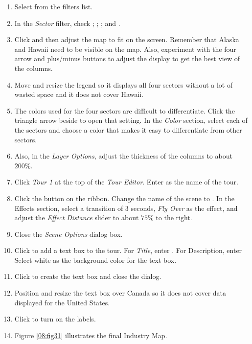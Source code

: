 \begin{enumbox}
\begin{enumerate}
		\item Select  from the filters list.
		\item In the \textit{Sector} filter, check ; ; ; and .
		\item Click  and then adjust the map to fit on the screen. Remember that Alaska and Hawaii need to be visible on the map. Also, experiment with the four arrow and plus/minus buttons to adjust the display to get the best view of the columns.
		\item Move and resize the legend so it displays all four sectors without a lot of wasted space and it does not cover Hawaii.
		\item The colors used for the four sectors are difficult to differentiate. Click the triangle arrow beside  to open that setting. In the \textit{Color} section, select each of the sectors and choose a color that makes it easy to differentiate from other sectors.
		\item Also, in the \textit{Layer Options}, adjust the thickness of the columns to about $ 200\% $.
		\item Click \textit{Tour 1} at the top of the \textit{Tour Editor}. Enter  as the name of the tour. 
		\item Click the  button on the ribbon. Change the name of the scene to . In the Effects section, select a transition of $ 3 $ seconds, \textit{Fly Over} as the effect, and adjust the \textit{Effect Distance} slider to about $ 75\% $ to the right.
		\item Close the \textit{Scene Options} dialog box.
		\item Click  to add a text box to the tour. For \textit{Title}, enter . For Description, enter  Select white as the background color for the text box.
		\item Click  to create the text box and close the dialog.
		\item Position and resize the text box over Canada so it does not cover data displayed for the United States.
		\item Click  to turn on the labels.
		\item Figure \ref{08:fig31} illustrates the final Industry Map.
		

\end{enumerate}
\end{enumbox}
